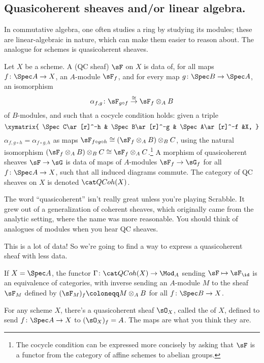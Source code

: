 \subsection*{Quasicoherent sheaves and/or linear algebra.}
In commutative algebra, one often studies a ring by studying its modules; these are linear-algebraic in nature,
which can make them easier to reason about. The analogue for schemes is quasicoherent sheaves.
\begin{defn}
Let $X$ be a scheme. A  (QC sheaf) $\sF$ on $X$ is data of, for all maps $f\colon \Spec
A\to X$, an $A$-module $\sF_f$, and for every map $g\colon\Spec B\to\Spec A$, an isomorphism
\begin{equation}
	\alpha_{f,g}\colon \sF_{g\circ f} \overset\cong\to \sF_f\otimes_A B
\end{equation}
of $B$-modules, and such that a cocycle condition holds: given a triple
\begin{equation}
\xymatrix{
	\Spec C\ar[r]^-h & \Spec B\ar[r]^-g & \Spec A\ar[r]^-f &X,
}
\end{equation}
$\alpha_{f, g\circ h} = \alpha_{f\circ g, h}$ as maps $\sF_{f\circ g\circ h}\cong  (\sF_f\otimes_A B)\otimes_B C$,
using the natural isomorphism $(\sF_f\otimes_A B)\otimes_B C\cong \sF_f\otimes_A C$.\footnote{The cocycle condition
can be expressed more concisely by asking that $\sF$ is a functor from the category of affine schemes to abelian
groups.} A morphism of quasicoherent sheaves $\sF\to\sG$ is data of maps of $A$-modules $\sF_f\to\sG_f$ for all
$f\colon\Spec A\to X$, such that all induced diagrams commute. The category of QC sheaves on $X$ is denoted
$\QCoh(X)$.
\end{defn}
\begin{rem}
The word ``quasicoherent'' isn't really great unless you're playing Scrabble. It grew out of a generalization of
coherent sheaves, which originally came from the analytic setting, where the name was more reasonable. You should
think of analogues of modules when you hear QC sheaves.
\end{rem}
This is a lot of data! So we're going to find a way to express a quasicoherent sheaf with less data.
\begin{prop}
\label{QCequiv}
If $X = \Spec A$, the functor $\Gamma\colon\QCoh(X)\to\Mod_A$ sending $\sF\mapsto\sF_\id$ is an equivalence of
categories, with inverse sending an $A$-module $M$ to the sheaf $\sF_M$ defined by $(\sF_M)_f\coloneqq M\otimes_A
B$ for all $f\colon\Spec B\to X$.
\end{prop}
\begin{exm}
For any scheme $X$, there's a quasicoherent sheaf $\sO_X$, called the  of $X$, defined to
send $f\colon\Spec A\to X$ to $(\sO_X)_f = A$. The maps are what you think they are.
\end{exm}
